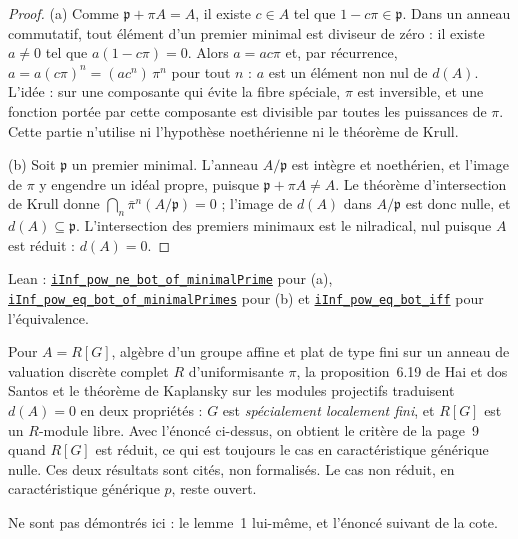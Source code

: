 \begin{proof}
(a) Comme $\mathfrak p + \pi A = A$, il existe $c \in A$ tel que $1 - c\pi \in \mathfrak p$. Dans un anneau commutatif, tout élément d'un premier minimal est diviseur de zéro : il existe $a \neq 0$ tel que $a(1 - c\pi) = 0$. Alors $a = ac\pi$ et, par récurrence, $a = a(c\pi)^n = (ac^n)\,\pi^n$ pour tout $n$ : $a$ est un élément non nul de $d(A)$. L'idée : sur une composante qui évite la fibre spéciale, $\pi$ est inversible, et une fonction portée par cette composante est divisible par toutes les puissances de $\pi$. Cette partie n'utilise ni l'hypothèse noethérienne ni le théorème de Krull.

(b) Soit $\mathfrak p$ un premier minimal. L'anneau $A/\mathfrak p$ est intègre et noethérien, et l'image de $\pi$ y engendre un idéal propre, puisque $\mathfrak p + \pi A \neq A$. Le théorème d'intersection de Krull donne $\bigcap_n \bar\pi^n (A/\mathfrak p) = 0$ ; l'image de $d(A)$ dans $A/\mathfrak p$ est donc nulle, et $d(A) \subseteq \mathfrak p$. L'intersection des premiers minimaux est le nilradical, nul puisque $A$ est réduit : $d(A) = 0$.
\end{proof}

\noindent Lean : \href{\leanblobmain/AlgebraicGeometry/Folder90.lean}{\texttt{iInf\_pow\_ne\_bot\_of\_minimalPrime}} pour (a), \href{\leanblobmain/AlgebraicGeometry/Folder90.lean}{\texttt{iInf\_pow\_eq\_bot\_of\_minimalPrimes}} pour (b) et \href{\leanblobmain/AlgebraicGeometry/Folder90.lean}{\texttt{iInf\_pow\_eq\_bot\_iff}} pour l'équivalence.

\begin{remarque}
Pour $A = R[G]$, algèbre d'un groupe affine et plat de type fini sur un anneau de valuation discrète complet $R$ d'uniformisante $\pi$, la proposition~6.19 de Hai et dos Santos \cite{haidossantos2018} et le théorème de Kaplansky sur les modules projectifs traduisent $d(A) = 0$ en deux propriétés : $G$ est \emph{spécialement localement fini}, et $R[G]$ est un $R$-module libre. Avec l'énoncé ci-dessus, on obtient le critère de la page~9 quand $R[G]$ est réduit, ce qui est toujours le cas en caractéristique générique nulle. Ces deux résultats sont cités, non formalisés. Le cas non réduit, en caractéristique générique $p$, reste ouvert.
\end{remarque}

Ne sont pas démontrés ici : le lemme~1 lui-même, et l'énoncé suivant de la cote.

